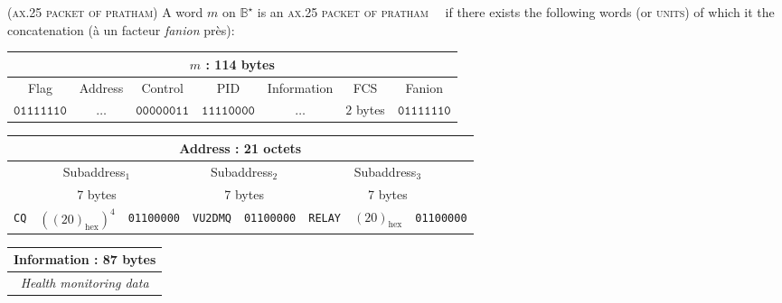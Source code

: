 \documentclass[twocolumn,pre,floats,aps,amsmath,amssymb]{revtex4}
\newenvironment{definition}[1][D\'efinition.]{\begin{trivlist}
\item[\hskip \labelsep {\bfseries #1}]}{\end{trivlist}}
\begin{document}
\begin{definition}
  \textsc{(ax.25 packet of pratham)}
  A word $m$ on $\mathbb{B}^{\star}$ is an \textsc{ax.25 packet of pratham}~\cite{IITB}~\cite{ax25} if there exists the following words (or \textsc{units}) of which it the concatenation (\`a un facteur \textit{fanion} pr\`es):
  \begin{footnotesize}
    \begin{tabular}{|c|c|c|c|c|c|c|}
      \hline
      \multicolumn{7}{|c|}{$m$ : 114 bytes}\\
      \hline
      Flag & Address & Control & PID & {\tiny Information} & FCS & Fanion\\
      \hline
      $\texttt{01111110}$ & $\dots$ & $\texttt{00000011}$ & $\texttt{11110000}$ & $\dots$ & $2$ bytes & $\texttt{01111110}$\\
      \hline
    \end{tabular}
  \end{footnotesize}
\begin{center}
  \begin{footnotesize}
    \begin{tabular}{|c|c|c|c|c|c|c|c|}
      \hline
      \multicolumn{8}{|c|}{Address : 21 octets}\\
      \hline
      \multicolumn{3}{|c|}{Subaddress$_1$} & \multicolumn{2}{c|}{Subaddress$_2$} & \multicolumn{3}{c|}{Subaddress$_3$}\\
      \hline
      \multicolumn{3}{|c|}{7 bytes} & \multicolumn{2}{c|}{7 bytes} & \multicolumn{3}{c|}{7 bytes}\\
      \hline
      \texttt{CQ} & $\left ( (20)_{\operatorname{hex}} \right )^4$ & \texttt{01100000} & \texttt{VU2DMQ} & \texttt{01100000} & \texttt{RELAY} & $(20)_{\operatorname{hex}}$ & \texttt{01100000}\\
      \hline
    \end{tabular}
  \end{footnotesize}
\end{center}

\begin{center}
  \begin{footnotesize}
    \begin{tabular}{|c|}
      \hline
      Information : 87 bytes\\
      \hline
      \textit{Health monitoring data}\cite{IITB}\\
      \hline
    \end{tabular}
  \end{footnotesize}
\end{center}

\end{definition}
\end{document}
